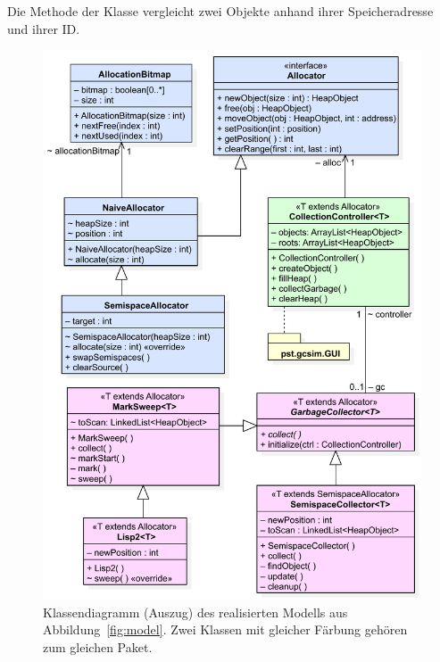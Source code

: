 \begin{listing}[h]
	\inputminted[]{java}{code/AddressComparator.java}
	\caption[Klasse  zum Vergleich von Objekten]{Die Methode  der Klasse  vergleicht zwei Objekte anhand ihrer Speicheradresse und ihrer ID.}
	\label{java:comparator}
\end{listing}

\begin{figure}[t!]
	\centering
	\includegraphics[scale=0.6]{img/uml/ch7-klassen.pdf}
	\caption[Klassendiagramm des realisierten Modells (Auszug)]{Klassendiagramm (Auszug) des realisierten Modells aus Abbildung~\ref{fig:model}. Zwei Klassen mit gleicher Färbung gehören zum gleichen Paket.}
	\label{fig:implementation}
\end{figure}

